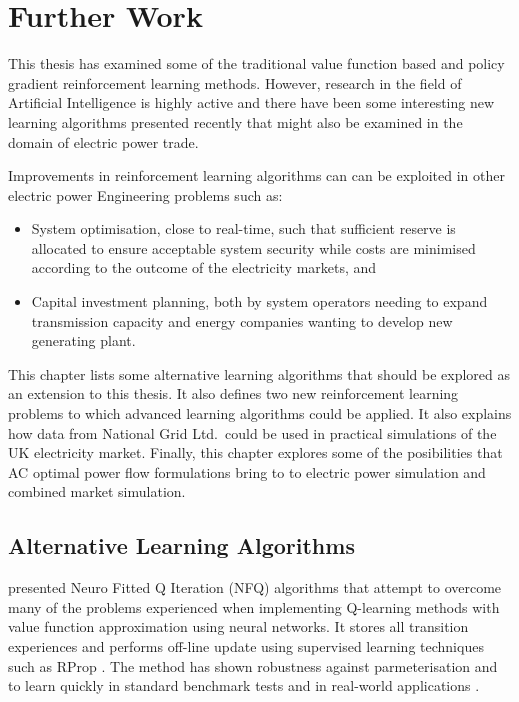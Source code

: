 \chapter{Further Work}
\label{sec:furtherwork}
This thesis has examined some of the traditional value function based and
policy gradient reinforcement learning methods.  However, research in the field
of Artificial Intelligence is highly active and there have been some
interesting new learning algorithms presented recently that might also be
examined in the domain of electric power trade.

Improvements in reinforcement learning algorithms can can be exploited in other
electric power Engineering problems such as:
\begin{itemize}
  \item System optimisation, close to real-time, such that sufficient reserve
  is allocated to ensure acceptable system security while costs are minimised
  according to the outcome of the electricity markets, and
  \item Capital investment planning, both by system operators needing to expand
  transmission capacity and energy companies wanting to develop new generating
  plant.
\end{itemize}

This chapter lists some alternative learning algorithms that should be explored
as an extension to this thesis.  It also defines two new reinforcement
learning problems to which  advanced learning algorithms could be applied.
It also explains how data from National Grid Ltd.~could be used in practical
simulations of the UK electricity market.  Finally, this chapter explores some
of the posibilities that AC optimal power flow formulations bring to to
electric power simulation and combined market simulation.

\section{Alternative Learning Algorithms}
 presented Neuro Fitted Q Iteration (NFQ) algorithms
that attempt to overcome many of the problems experienced when implementing
Q-learning methods with value function approximation using neural networks.  It
stores all transition experiences and performs off-line update using supervised
learning techniques such as RProp \cite{riedmiller93}.  The method has shown
robustness against parmeterisation and to learn quickly in standard benchmark
tests and in real-world applications \cite{kietzmann09}.

